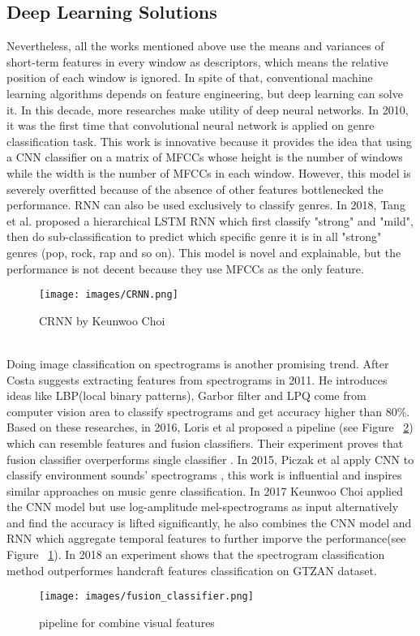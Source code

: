 \documentclass[a4paper, 11pt]{report}
\begin{document}
 \subsection{Deep Learning Solutions}
Nevertheless, all the works mentioned above use the means and variances of short-term features in every window as descriptors, which means the relative position of each window is ignored. In spite of that, conventional machine learning algorithms depends on feature engineering, but deep learning can solve it\cite{deeplearning}. In this decade, more researches make utility of deep neural networks. In 2010, it was the first time that convolutional neural network is applied on genre classification task\cite{klc2}. This work is innovative because it provides the idea that using a CNN classifier on a matrix of MFCCs whose height is the number of windows while the width is the number of MFCCs in each window. However, this model is severely overfitted because of the absence of other features bottlenecked the performance. RNN can also be used exclusively to classify genres. In 2018, Tang et al. proposed a hierarchical LSTM RNN\cite{tang2018music} which first classify "strong" and "mild", then do sub-classification to predict which specific genre it is in all "strong" genres (pop, rock, rap and so on). This model is novel and explainable, but the performance is not decent because they use MFCCs as the only feature.\\
 \begin{figure}[h]
	\caption{CRNN by Keunwoo Choi}
	\centering
	\texttt{[image: images/CRNN.png]}
	\label{fig:choi's CRNN}
\end{figure}\\
Doing image classification on spectrograms is another promising trend. After Costa suggests extracting features from spectrograms in 2011. He introduces ideas like LBP(local binary patterns), Garbor filter and LPQ come from computer vision area to classify spectrograms\cite{costa2012music}\cite{costa2013music} and get accuracy higher than 80\%. Based on these researches, in 2016, Loris et al proposed a pipeline (see Figure  ~\ref{fig:fusion pipeline}) which can resemble features and fusion classifiers. Their experiment proves that fusion classifier overperforms single classifier \cite{nanni2016combining}. In 2015, Piczak et al apply CNN to classify environment sounds' spectrograms \cite{ piczak2015environmental}, this work is influential and inspires similar approaches on music genre classification. In 2017 Keunwoo Choi applied the CNN model but use log-amplitude mel-spectrograms as input alternatively and find the accuracy is lifted significantly, he also combines the CNN model and RNN which aggregate temporal features to further imporve the performance(see Figure ~\ref{fig:choi's CRNN}).  In 2018 an experiment shows that the spectrogram classification method outperformes handcraft features classification on GTZAN dataset\cite{bahuleyan2018music}.
 \begin{figure}[h]
 	\caption{pipeline for combine visual features}
 	\centering
 	\texttt{[image: images/fusion\_classifier.png]}
 	\label{fig:fusion pipeline}
 \end{figure}
\end{document}
